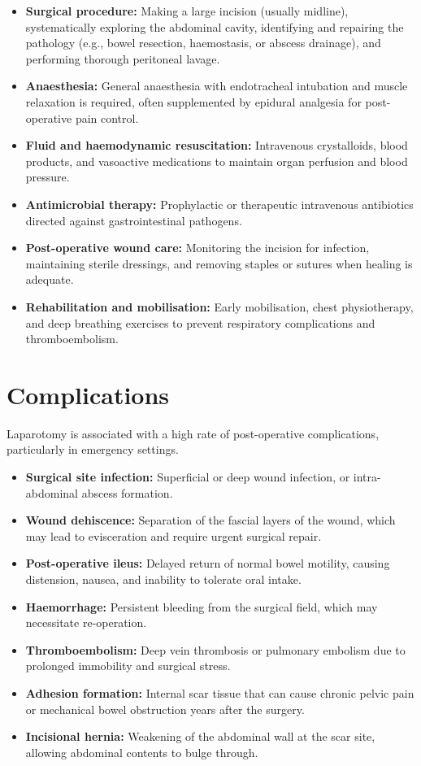 \begin{itemize}
    \item \textbf{Surgical procedure:} Making a large incision (usually midline), systematically exploring the abdominal cavity, identifying and repairing the pathology (e.g., bowel resection, haemostasis, or abscess drainage), and performing thorough peritoneal lavage.
    \item \textbf{Anaesthesia:} General anaesthesia with endotracheal intubation and muscle relaxation is required, often supplemented by epidural analgesia for post-operative pain control.
    \item \textbf{Fluid and haemodynamic resuscitation:} Intravenous crystalloids, blood products, and vasoactive medications to maintain organ perfusion and blood pressure.
    \item \textbf{Antimicrobial therapy:} Prophylactic or therapeutic intravenous antibiotics directed against gastrointestinal pathogens.
    \item \textbf{Post-operative wound care:} Monitoring the incision for infection, maintaining sterile dressings, and removing staples or sutures when healing is adequate.
    \item \textbf{Rehabilitation and mobilisation:} Early mobilisation, chest physiotherapy, and deep breathing exercises to prevent respiratory complications and thromboembolism.
\end{itemize}

\section*{Complications}
Laparotomy is associated with a high rate of post-operative complications, particularly in emergency settings.

\begin{itemize}
    \item \textbf{Surgical site infection:} Superficial or deep wound infection, or intra-abdominal abscess formation.
    \item \textbf{Wound dehiscence:} Separation of the fascial layers of the wound, which may lead to evisceration and require urgent surgical repair.
    \item \textbf{Post-operative ileus:} Delayed return of normal bowel motility, causing distension, nausea, and inability to tolerate oral intake.
    \item \textbf{Haemorrhage:} Persistent bleeding from the surgical field, which may necessitate re-operation.
    \item \textbf{Thromboembolism:} Deep vein thrombosis or pulmonary embolism due to prolonged immobility and surgical stress.
    \item \textbf{Adhesion formation:} Internal scar tissue that can cause chronic pelvic pain or mechanical bowel obstruction years after the surgery.
    \item \textbf{Incisional hernia:} Weakening of the abdominal wall at the scar site, allowing abdominal contents to bulge through.
\end{itemize}

